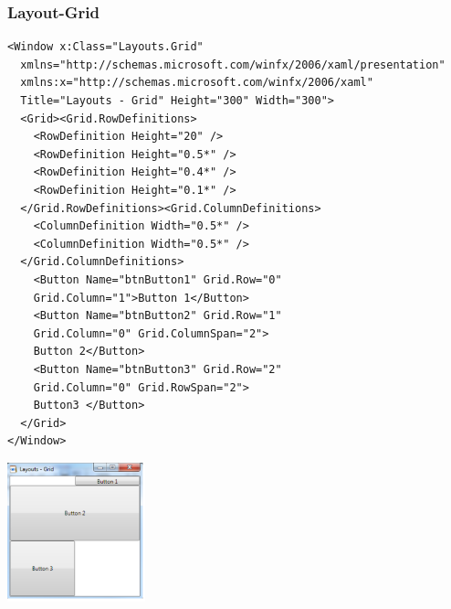\subsubsection{Layout-Grid}
\begin{minipage}{14cm}
\begin{lstlisting}[style=CSharp]
<Window x:Class="Layouts.Grid"
  xmlns="http://schemas.microsoft.com/winfx/2006/xaml/presentation"
  xmlns:x="http://schemas.microsoft.com/winfx/2006/xaml"
  Title="Layouts - Grid" Height="300" Width="300">
  <Grid><Grid.RowDefinitions>
    <RowDefinition Height="20" />
    <RowDefinition Height="0.5*" />
    <RowDefinition Height="0.4*" />
    <RowDefinition Height="0.1*" />
  </Grid.RowDefinitions><Grid.ColumnDefinitions>
    <ColumnDefinition Width="0.5*" />
    <ColumnDefinition Width="0.5*" />
  </Grid.ColumnDefinitions>
    <Button Name="btnButton1" Grid.Row="0"
    Grid.Column="1">Button 1</Button>
    <Button Name="btnButton2" Grid.Row="1"
    Grid.Column="0" Grid.ColumnSpan="2">
    Button 2</Button>
    <Button Name="btnButton3" Grid.Row="2"
    Grid.Column="0" Grid.RowSpan="2">
    Button3 </Button>
  </Grid>
</Window>
\end{lstlisting}
\end{minipage}
\begin{minipage}{4cm}
  \includegraphics[width=4cm]{images/XAML/Grid}
\end{minipage}


